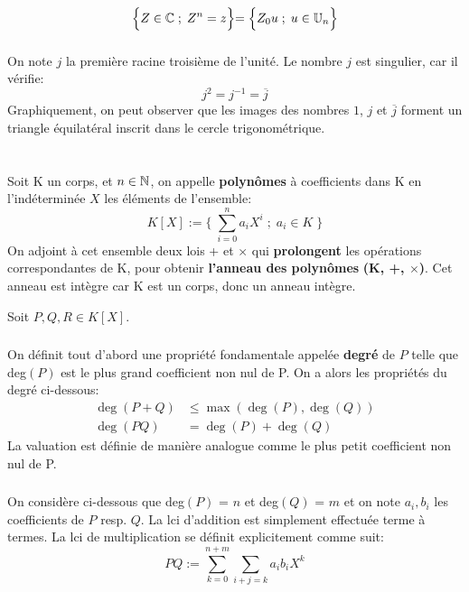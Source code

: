 \[
   \Bigl\{ Z \in \mathbb{C} \; ; \; Z^n = z \Bigl\} = \Bigl\{ Z_0u \; ; \; u \in \mathbb{U}_n \Bigl\}   
\]
\subsection*{}
On note \(j\) la première racine troisième de l'unité.
Le nombre \(j\) est singulier, car il vérifie:
\[
   j^2 = j^{-1} = \overline{j}
\]
Graphiquement, on peut observer que les images des nombres \(1\), \(j\) et \(\overline{j}\) forment un triangle équilatéral inscrit dans le cercle trigonométrique.

\chapter*{}
Soit K un corps, et \(n \in \mathbb{N}\), on appelle \textbf{polynômes} à coefficients dans K en l'indéterminée \(X\) les éléments de l'ensemble:
\[
   K[X] := \Biggl\{ \; \sum_{i=0}^n a_{i}X^{i} \; ; \; a_i \in K \;\Biggl\}
\]
On adjoint à cet ensemble deux lois + et \(\times\) qui \textbf{prolongent} les opérations correspondantes de K, pour obtenir \textbf{l'anneau des polynômes} \textbf{(K, +, \(\times\))}. Cet anneau est intègre car K est un corps, donc un anneau intègre.\<

Soit \(P, Q, R \in K[X]\).

\subsection*{}
On définit tout d'abord une propriété fondamentale appelée \textbf{degré} de \(P\) telle que deg\((P)\) est le plus grand coefficient non nul de P.
On a alors les propriétés du degré ci-dessous:
\begin{align*}
   \deg(P + Q) &\leq \max(\deg(P), \deg(Q))\\
   \deg(PQ) &= \deg(P) + \deg(Q)
\end{align*}
La valuation est définie de manière analogue comme le plus petit coefficient non nul de P.
\subsection*{}
On considère ci-dessous que deg\((P)\) = \(n\) et deg\((Q)\) = \(m\) et on note \(a_i, b_i\) les coefficients de \(P\) resp. \(Q\).\+
La lci d'addition est simplement effectuée terme à termes.\+
La lci de multiplication se définit explicitement comme suit:
\[
   PQ := \sum_{k=0}^{n+m}\sum_{i+j = k} a_{i}b_{i}X^{k}
\]

